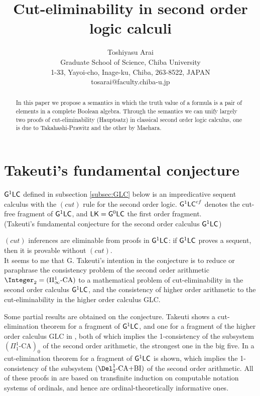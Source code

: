 \documentclass{article}
\title{Cut-eliminability in second order logic calculi
}
\author{
Toshiyasu Arai
\\
Graduate School of Science,
Chiba University
\\
1-33, Yayoi-cho, Inage-ku,
Chiba, 263-8522, JAPAN
\\
tosarai@faculty.chiba-u.jp
}
\date{}
\begin{document}
\maketitle

\begin{abstract}
In this paper we propose a semantics in which the truth value of a formula is a pair of elements in a complete Boolean algebra.
Through the semantics we can unify largely two proofs of cut-eliminability (Hauptsatz) in classical second order logic calculus,
one is due to Takahashi-Prawitz and the other by Maehara.
\end{abstract}



\section{Takeuti's fundamental conjecture}
${\sf G}^{1}{\sf LC}$ defined in subsection \ref{subsec:GLC} below
is an impredicative sequent calculus with the $(cut)$ rule for the second order logic.
${\sf G}^{1}{\sf LC}^{cf}$ denotes the cut-free fragment of ${\sf G}^{1}{\sf LC}$, and
${\sf LK}={\sf G}^{0}{\sf LC}$ the first order fragment.
\\

\noindent
(Takeuti's fundamental conjecture for the second order calculus ${\sf G}^{1}{\sf LC}$\cite{Takeuti53})

$(cut)$ inferences are eliminable from proofs in ${\sf G}^{1}{\sf LC}$:
if ${\sf G}^{1}{\sf LC}$ proves a sequent, then it is provable without $(cut)$.
\\

It seems to me that G. Takeuti's intention in the conjecture is to reduce or paraphrase
the consistency problem of the second order arithmetic $\Integer_{2}=(\Pi^{1}_{\infty}\mbox{-CA})$
to a mathematical problem of cut-eliminability in the second order calculus ${\sf G}^{1}{\sf LC}$,
and the consistency of higher order arithmetic to the cut-eliminability in the higher order calculus {\sf GLC}.


Some partial results are obtained on the conjecture.
Takeuti \cite{FC5} shows a cut-elimination theorem for a fragment of ${\sf G}^{1}{\sf LC}$,
and one for a fragment of the higher order calculus {\sf GLC} in \cite{FC6},
both of which implies the 1-consistency of the subsystem $(\Pi^{1}_{1}\mbox{-CA})_{0}$ of the second order arithmetic,
the strongest one in the big five.
In \cite{SBL} a cut-elimination theorem for a fragment of ${\sf G}^{1}{\sf LC}$ is shown,
which implies the 1-consistency of the subsystem $(\Del^{1}_{2}\mbox{-CA+BI})$ of the second order arithmetic.
All of these proofs in \cite{FC5, FC6, SBL} are based on transfinite induction on computable notation systems of ordinals,
and hence are ordinal-theoretically informative ones.
\end{document}

